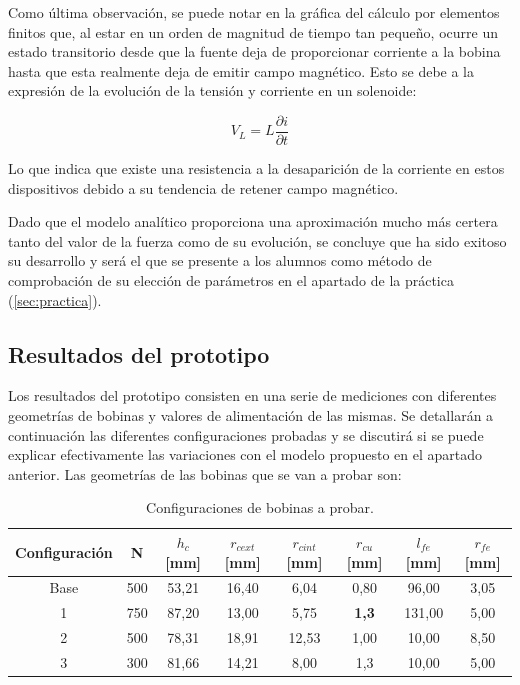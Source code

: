 Como última observación, se puede notar en la gráfica del cálculo por elementos finitos que, al estar en un orden de magnitud de tiempo tan pequeño, ocurre un estado transitorio desde que la fuente deja de proporcionar corriente a la bobina hasta que esta realmente deja de emitir campo magnético. Esto se debe a la expresión de la evolución de la tensión y corriente en un solenoide:

\[V_L=L\frac{\partial i}{\partial t}\]

Lo que indica que existe una resistencia a la desaparición de la corriente en estos dispositivos debido a su tendencia de retener campo magnético.

Dado que el modelo analítico proporciona una aproximación mucho más certera tanto del valor de la fuerza como de su evolución, se concluye que ha sido exitoso su desarrollo y será el que se presente a los alumnos como método de comprobación de su elección de parámetros en el apartado de la práctica (\ref{sec:practica}).

\subsection{Resultados del prototipo}
\label{subsec:prototipoResults}

Los resultados del prototipo consisten en una serie de mediciones con diferentes geometrías de bobinas y valores de alimentación de las mismas. Se detallarán a continuación las diferentes configuraciones probadas y se discutirá si se puede explicar efectivamente las variaciones con el modelo propuesto en el apartado anterior. Las geometrías de las bobinas que se van a probar son:

\begin{table}[H]
    \centering
    \setlength{\tabcolsep}{5pt}
    \renewcommand{\arraystretch}{1.2}
    \begin{tabular}{|c|c|c|c|c|c|c|c|}
        \hline
        \textbf{Configuración} & \textbf{N} & \textbf{\(h_c\) [mm]} & \textbf{\(r_{cext}\) [mm]} & \textbf{\(r_{cint}\) [mm]} & \textbf{\(r_{cu}\) [mm]} & \textbf{\(l_{fe}\) [mm]} & \textbf{\(r_{fe}\) [mm]} \\
        \hline
        Base & 500 & 53,21 & 16,40 & 6,04 & 0,80 & 96,00 & 3,05 \\
        1 & 750 & 87,20 & 13,00 & 5,75 & \textbf{1,3} & 131,00 & 5,00 \\
        2 & 500 & 78,31 & 18,91 & 12,53 & 1,00 & 10,00 & 8,50 \\
        3 & 300 & 81,66 & 14,21 & 8,00 & 1,3 & 10,00 & 5,00 \\
        \hline
    \end{tabular}
    \caption{Configuraciones de bobinas a probar.}
    \label{tab:geometrias}
\end{table}

